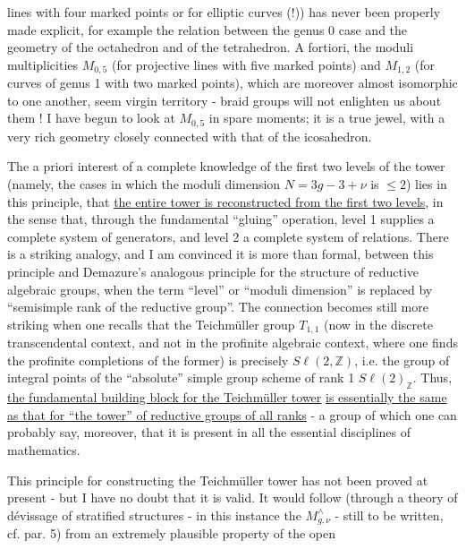 
lines with four marked points or for elliptic
curves (!)) has never been properly made explicit, for example the relation
between the genus 0 case and the geometry of the octahedron and of the
tetrahedron. A fortiori, the moduli multiplicities $M_{0,5}$ (for
projective lines with five marked points) and $M_{1,2}$ (for
curves of genus 1 with two marked points), which are moreover almost
isomorphic to one another, seem virgin territory - braid groups
will not enlighten us about them ! I have begun to
look at $M_{0,5}$ in spare moments; it is a true jewel, with a
very rich geometry closely connected with that of the icosahedron.

The a priori interest of a complete knowledge of the first two
levels of the tower (namely, the cases in which the moduli dimension
$N = 3g-3+\nu$ is $\leq 2$) lies in this principle, that \uline{the entire tower
is reconstructed from the first two levels}, in the sense that, through
the fundamental ``gluing'' operation, level 1 supplies a
complete system of generators, and level 2 a complete system of
relations. There is a striking analogy, and I am convinced it is
more than formal, between this principle and Demazure's analogous
principle for the structure of reductive algebraic groups, when
the term ``level'' or ``moduli dimension'' is replaced by ``semisimple
rank of the reductive group''. The connection becomes still more striking
when one recalls that the Teichmüller group $T_{1,1}$ (now in the
discrete transcendental context, and not in the profinite algebraic
context, where one finds the profinite completions of the former) is
precisely $S\ell(2,\mathbb{Z})$, i.e. the group of integral points of the
``absolute'' simple group scheme of rank 1 $S\ell(2)_{\mathbb{Z}}$. Thus, \uline{the fundamental
building block for the Teichmüller tower} \uline{is essentially
the same as that for ``the tower'' of reductive groups of all ranks} -
a group of which one can probably say, moreover, that it is present
in all the essential disciplines of mathematics.

This principle for constructing the Teichmüller tower has
not been proved at present - but I have no doubt that it
is valid. It would follow (through a theory of dévissage of stratified
structures - in this instance the $M^{\wedge}_{g,\nu}$ - still to be written,
cf. par. 5) from an extremely plausible property of the open


